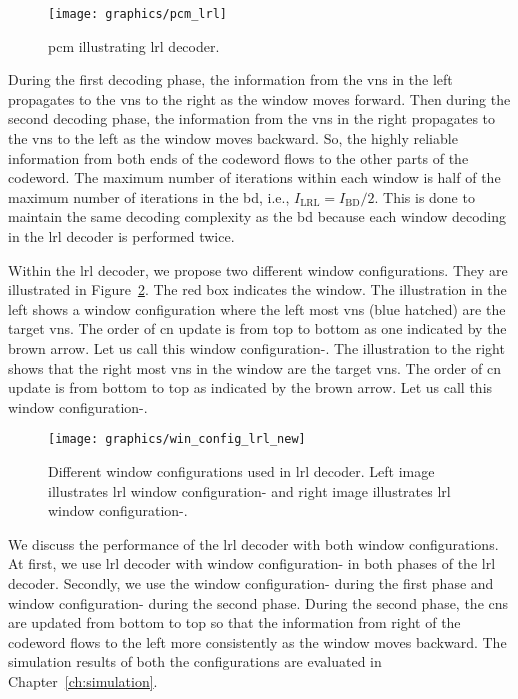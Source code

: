 \begin{figure}[htbp]
  \centering
  \texttt{[image: graphics/pcm\_lrl]}
  \caption{\gls{pcm} illustrating \gls{lrl} decoder.}
  \label{fig:pcm_lrl}
\end{figure}
During the first decoding phase, the information from the \glspl{vn} in the left propagates to the \glspl{vn} to the right as the window moves forward. Then during the second decoding phase, the information from the \glspl{vn} in the right propagates to the \glspl{vn} to the left as the window moves backward. So, the highly reliable information from both ends of the codeword flows to the other parts of the codeword. The maximum number of iterations within each window is half of the maximum number of iterations in the \gls{bd}, i.e., $I_{\text{LRL}}=I_{\text{BD}}/2$. This is done to maintain the same decoding complexity as the \gls{bd} because each window decoding in the \gls{lrl} decoder is performed twice.

Within the \gls{lrl} decoder, we propose two different window configurations. They are illustrated in Figure~\ref{fig:win_config_lrl}. The red box indicates the window. The illustration in the left shows a window configuration where the left most \glspl{vn} (blue hatched) are the target \glspl{vn}. The order of \gls{cn} update is from top to bottom as one indicated by the brown arrow. Let us call this window configuration-. The illustration to the right shows that the right most \glspl{vn} in the window are the target \glspl{vn}. The order of \gls{cn} update is from bottom to top as indicated by the brown arrow. Let us call this window configuration-.

\begin{figure}[htbp]
  \centering
  \texttt{[image: graphics/win\_config\_lrl\_new]}
  \caption{Different window configurations used in \gls{lrl} decoder. Left image illustrates \gls{lrl} window configuration- and right image illustrates \gls{lrl} window configuration-.}
  \label{fig:win_config_lrl}
\end{figure}

We discuss the performance of the \gls{lrl} decoder with both window configurations. At first, we use \gls{lrl} decoder with window configuration- in both phases of the \gls{lrl} decoder. Secondly, we use the window configuration- during the first phase and window configuration- during the second phase. During the second phase, the \glspl{cn} are updated from bottom to top so that the information from right of the codeword flows to the left more consistently as the window moves backward. The simulation results of both the configurations are evaluated in Chapter~\ref{ch:simulation}.

